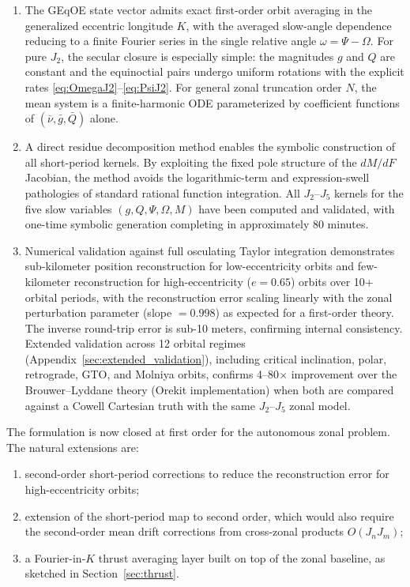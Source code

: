 \documentclass[11pt]{article}
\begin{document}
\begin{enumerate}
    \item The GEqOE state vector admits exact first-order orbit averaging in
    the generalized eccentric longitude $K$, with the averaged slow-angle
    dependence reducing to a finite Fourier series in the single relative
    angle $\omega = \Psi - \Omega$. For pure $J_2$, the secular closure is
    especially simple: the magnitudes $g$ and $Q$ are constant and the
    equinoctial pairs undergo uniform rotations with the explicit rates
    \eqref{eq:OmegaJ2}--\eqref{eq:PsiJ2}. For general zonal truncation
    order $N$, the mean system is a finite-harmonic ODE parameterized by
    coefficient functions of $(\bar\nu, \bar g, \bar Q)$ alone.

    \item A direct residue decomposition method enables the symbolic
    construction of all short-period kernels. By exploiting the fixed pole
    structure of the $dM/dF$ Jacobian, the method avoids the logarithmic-term
    and expression-swell pathologies of standard rational function integration.
    All $J_2$--$J_5$ kernels for the five slow variables
    $(g, Q, \Psi, \Omega, M)$ have been computed and validated, with one-time
    symbolic generation completing in approximately 80 minutes.

    \item Numerical validation against full osculating Taylor integration
    demonstrates sub-kilometer position reconstruction for low-eccentricity
    orbits and few-kilometer reconstruction for high-eccentricity ($e=0.65$)
    orbits over 10+ orbital periods, with the reconstruction error scaling
    linearly with the zonal perturbation parameter (slope $= 0.998$) as
    expected for a first-order theory. The inverse round-trip error is
    sub-10 meters, confirming internal consistency. Extended validation
    across 12 orbital regimes (Appendix~\ref{sec:extended_validation}),
    including critical inclination, polar, retrograde, GTO, and Molniya
    orbits, confirms 4--80$\times$ improvement over the Brouwer--Lyddane
    theory (Orekit implementation) when both are compared against a
    Cowell Cartesian truth with the same $J_2$--$J_5$ zonal model.
\end{enumerate}

The formulation is now closed at first order for the autonomous zonal problem.
The natural extensions are:
\begin{enumerate}
    \item second-order short-period corrections to reduce the reconstruction
    error for high-eccentricity orbits;
    \item extension of the short-period map to second order, which would
    also require the second-order mean drift corrections from cross-zonal
    products $O(J_n J_m)$;
    \item a Fourier-in-$K$ thrust averaging layer built on top of the
    zonal baseline, as sketched in Section~\ref{sec:thrust}.
\end{enumerate}
\end{document}
